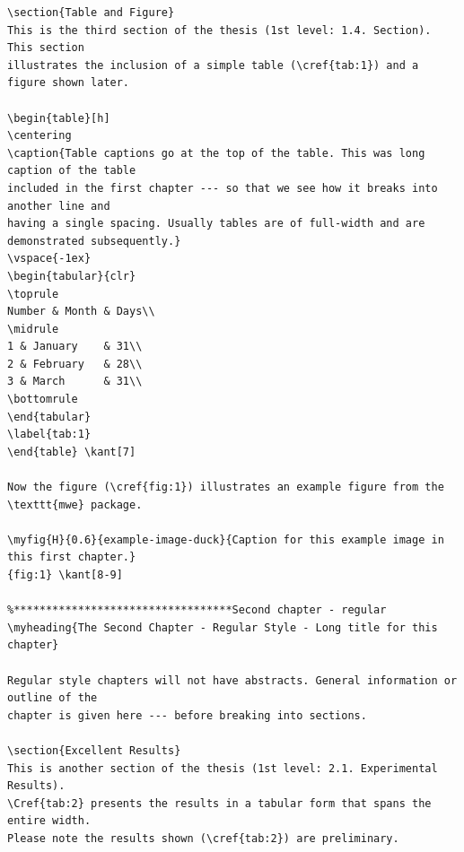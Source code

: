 \documentclass{article}
\begin{document}
\begin{verbatim}
\section{Table and Figure}
This is the third section of the thesis (1st level: 1.4. Section). This section
illustrates the inclusion of a simple table (\cref{tab:1}) and a figure shown later.

\begin{table}[h]
\centering
\caption{Table captions go at the top of the table. This was long caption of the table
included in the first chapter --- so that we see how it breaks into another line and
having a single spacing. Usually tables are of full-width and are demonstrated subsequently.}
\vspace{-1ex}
\begin{tabular}{clr}
\toprule
Number & Month & Days\\
\midrule
1 & January    & 31\\
2 & February   & 28\\
3 & March      & 31\\
\bottomrule
\end{tabular}
\label{tab:1}
\end{table}	\kant[7]

Now the figure (\cref{fig:1}) illustrates an example figure from the \texttt{mwe} package.

\myfig{H}{0.6}{example-image-duck}{Caption for this example image in this first chapter.}
{fig:1}	\kant[8-9]

%**********************************Second chapter - regular
\myheading{The Second Chapter - Regular Style - Long title for this chapter}

Regular style chapters will not have abstracts. General information or outline of the
chapter is given here --- before breaking into sections.

\section{Excellent Results}
This is another section of the thesis (1st level: 2.1. Experimental Results).
\Cref{tab:2} presents the results in a tabular form that spans the entire width.
Please note the results shown (\cref{tab:2}) are preliminary.


\end{verbatim}
\end{document}
